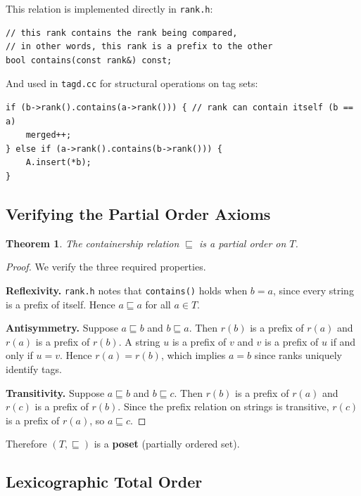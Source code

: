 \documentclass{article}
\newtheorem{theorem}{Theorem}[section]
\begin{document}
This relation is implemented directly in \texttt{rank.h}:
\begin{lstlisting}[style=cpp, caption={Containership via rank prefix in rank.h}]
// this rank contains the rank being compared,
// in other words, this rank is a prefix to the other
bool contains(const rank&) const;
\end{lstlisting}

And used in \texttt{tagd.cc} for structural operations on tag sets:
\begin{lstlisting}[style=cpp, caption={Containership used in merge\_containing\_tags (tagd.cc)}]
if (b->rank().contains(a->rank())) { // rank can contain itself (b == a)
    merged++;
} else if (a->rank().contains(b->rank())) {
    A.insert(*b);
}
\end{lstlisting}

\subsection{Verifying the Partial Order Axioms}

\begin{theorem}
The containership relation $\sqsubseteq$ is a partial order on $T$.
\end{theorem}

\begin{proof}
We verify the three required properties.

\textbf{Reflexivity.} \texttt{rank.h} notes that \texttt{contains()} holds when
$b = a$, since every string is a prefix of itself. Hence $a \sqsubseteq a$
for all $a \in T$.

\textbf{Antisymmetry.} Suppose $a \sqsubseteq b$ and $b \sqsubseteq a$. Then
$r(b)$ is a prefix of $r(a)$ and $r(a)$ is a prefix of $r(b)$. A string $u$
is a prefix of $v$ and $v$ is a prefix of $u$ if and only if $u = v$. Hence
$r(a) = r(b)$, which implies $a = b$ since ranks uniquely identify tags.

\textbf{Transitivity.} Suppose $a \sqsubseteq b$ and $b \sqsubseteq c$. Then
$r(b)$ is a prefix of $r(a)$ and $r(c)$ is a prefix of $r(b)$. Since the
prefix relation on strings is transitive, $r(c)$ is a prefix of $r(a)$, so
$a \sqsubseteq c$.
\end{proof}

Therefore $(T, \sqsubseteq)$ is a \textbf{poset} (partially ordered set).

\subsection{Lexicographic Total Order}
\end{document}
